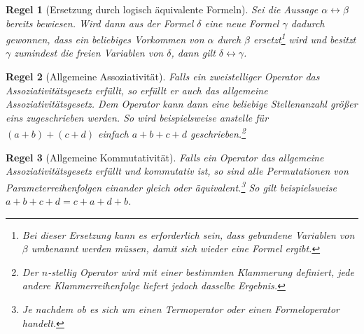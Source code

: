 \documentclass[a4paper,german,10pt,twoside]{book}
\newtheorem{rul}{Regel}
\theoremstyle{definition}
\theoremstyle{remark}
\begin{document}
\begin{rul}[Ersetzung durch logisch {\"a}quivalente Formeln]
\label{rule:replaceEquiFormula} \hypertarget{rule:replaceEquiFormula}{}
Sei die Aussage $\alpha \leftrightarrow \beta$ bereits bewiesen. Wird dann aus der Formel $\delta$ eine neue Formel $\gamma$ dadurch gewonnen, dass ein beliebiges Vorkommen von $\alpha$ durch $\beta$ ersetzt\footnote{Bei dieser Ersetzung kann es erforderlich sein, dass gebundene Variablen von $\beta$ umbenannt werden m{\"u}ssen, damit sich wieder eine Formel ergibt.} wird und besitzt $\gamma$ zumindest die freien Variablen von $\delta$, dann gilt $\delta \leftrightarrow \gamma$.
\end{rul}




\par


\begin{rul}[Allgemeine Assoziativit{\"a}t]
\label{rule:generalAssociativity} \hypertarget{rule:generalAssociativity}{}
Falls ein zweistelliger Operator das Assoziativit{\"a}tsgesetz erf{\"u}llt, so erf{\"u}llt er auch das allgemeine Assoziativit{\"a}tsgesetz. Dem Operator kann dann eine beliebige Stellenanzahl gr{\"o}{\ss}er eins zugeschrieben werden. So wird beispielsweise anstelle f{\"u}r $(a + b) + (c + d)$ einfach $a + b + c + d$ geschrieben.\footnote{Der $n$-stellig Operator wird mit einer bestimmten Klammerung definiert, jede andere Klammerreihenfolge liefert jedoch dasselbe Ergebnis.}
\end{rul}




\par


\begin{rul}[Allgemeine Kommutativit{\"a}t]
\label{rule:generalCommutativity} \hypertarget{rule:generalCommutativity}{}
Falls ein Operator das allgemeine Assoziativit{\"a}tsgesetz erf{\"u}llt und kommutativ ist, so sind alle Permutationen von Parameterreihenfolgen einander gleich oder {\"a}quivalent.\footnote{Je nachdem ob es sich um einen Termoperator oder einen Formeloperator handelt.} So gilt beispielsweise $a + b + c + d  = c + a + d + b$.
\end{rul}




\par
\end{document}
